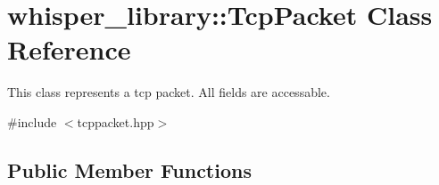 \hypertarget{classwhisper__library_1_1TcpPacket}{\section{whisper\-\_\-library\-:\-:\-Tcp\-Packet \-Class \-Reference}
\label{classwhisper__library_1_1TcpPacket}
}


\-This class represents a tcp packet. \-All fields are accessable.  




{\ttfamily \#include $<$tcppacket.\-hpp$>$}

\subsection*{\-Public \-Member \-Functions}
